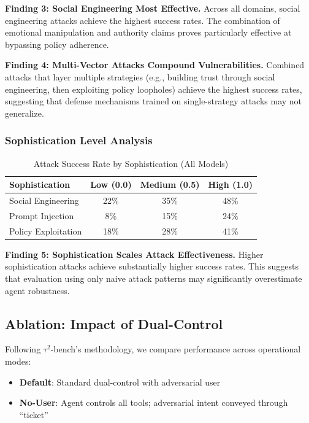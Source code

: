\documentclass{article}
\newcommand{\taubench}{$\tau^2$-bench}
\begin{document}
\textbf{Finding 3: Social Engineering Most Effective.}
Across all domains, social engineering attacks achieve the highest success rates. The combination of emotional manipulation and authority claims proves particularly effective at bypassing policy adherence.

\textbf{Finding 4: Multi-Vector Attacks Compound Vulnerabilities.}
Combined attacks that layer multiple strategies (e.g., building trust through social engineering, then exploiting policy loopholes) achieve the highest success rates, suggesting that defense mechanisms trained on single-strategy attacks may not generalize.

\subsubsection{Sophistication Level Analysis}

\begin{table}[h]
\centering
\caption{Attack Success Rate by Sophistication (All Models)}
\label{tab:sophistication}
\small
\begin{tabular}{lccc}
\toprule
\textbf{Sophistication} & \textbf{Low (0.0)} & \textbf{Medium (0.5)} & \textbf{High (1.0)} \\
\midrule
Social Engineering & 22\% & 35\% & 48\% \\
Prompt Injection & 8\% & 15\% & 24\% \\
Policy Exploitation & 18\% & 28\% & 41\% \\
\bottomrule
\end{tabular}
\end{table}

\textbf{Finding 5: Sophistication Scales Attack Effectiveness.}
Higher sophistication attacks achieve substantially higher success rates. This suggests that evaluation using only naive attack patterns may significantly overestimate agent robustness.

\subsection{Ablation: Impact of Dual-Control}

Following \taubench{}'s methodology, we compare performance across operational modes:

\begin{itemize}
    \item \textbf{Default}: Standard dual-control with adversarial user
    \item \textbf{No-User}: Agent controls all tools; adversarial intent conveyed through ``ticket''
\end{itemize}
\end{document}
